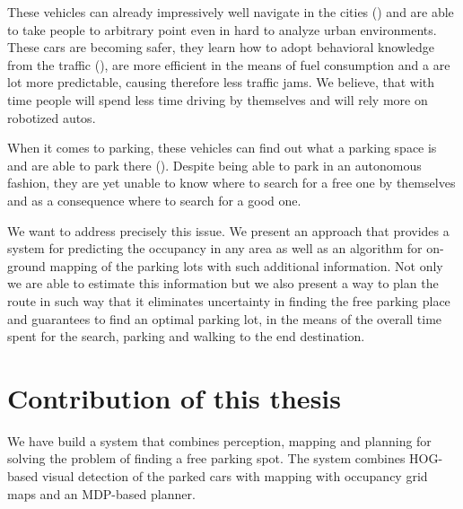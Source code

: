     These vehicles can already impressively well navigate in the cities (\cite{stanley_auto_car,perceprion_drivec_car,lima13}) and are able to take people to arbitrary point even in hard to analyze urban environments. These cars are becoming safer, they learn how to adopt behavioral knowledge from the traffic (\cite{behaviour_learning,spinello10:multiclass}), are more efficient in the means of fuel consumption and a are lot more predictable, causing therefore less traffic jams. We believe, that with time people will spend less time driving by themselves and will rely more on robotized autos.

    When it comes to parking, these vehicles can find out what a parking space is and are able to park there (\cite{auto_cars_burgard,auto_parking09,auto_park2_11}). Despite being able to park in an autonomous fashion, they are yet unable to know where to search for a free one by themselves and as a consequence where to search for a good one.

    We want to address precisely this issue. We present an approach that provides a system for predicting the occupancy in any area as well as an algorithm for on-ground mapping of the parking lots with such additional information. Not only we are able to estimate this information but we also present a way to plan the route in such way that it eliminates uncertainty in finding the free parking place and guarantees to find an optimal parking lot, in the means of the overall time spent for the search, parking and walking to the end destination.

    \section{Contribution of this thesis} %
    \label{sec:contribution_of_this_thesis}
        We have build a system that combines perception, mapping and planning for solving the problem of finding a free parking spot. The system combines HOG-based visual detection of the parked cars with mapping with occupancy grid maps and an MDP-based planner.
